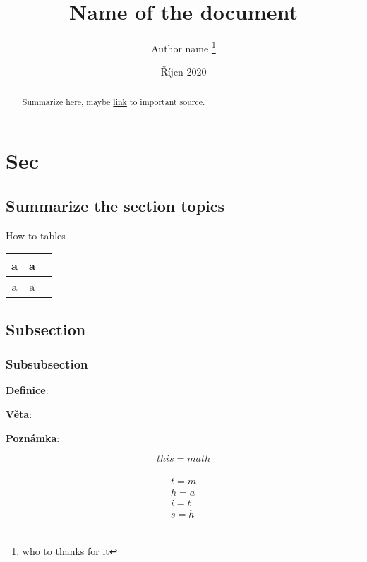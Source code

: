 \documentclass[12pt, letterpaper, twoside]{article}
\title{Name of the document}
\author{Author name \thanks{who to thanks for it}}
\date{Říjen 2020}
\begin{document}
\maketitle

\tableofcontents

\begin{abstract}
Summarize here, maybe \href{https://link.com}{link} to important source.
\end{abstract}

\section{Sec}

\subsection*{Summarize the section topics}

How to tables

\begin{center}
\begin{tabular}{ |c|c|c| }
    \hline
    a & a \\
    \hline
    a & a \\
    \hline
\end{tabular}
\end{center}

\subsection{Subsection}

\subsubsection{Subsubsection}

\textbf{Definice}:

\textbf{Věta}: 

\textbf{Poznámka}: 

\[
this = math
\]

\begin{multline} \\
    t = m \\
    h = a \\
    i = t \\
    s = h \\
\end{multline}
\end{document}
